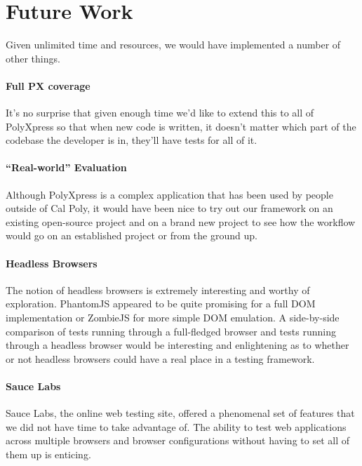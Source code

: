 \documentclass[12pt]{ucthesis}
\begin{document}
\chapter{Future Work}
Given unlimited time and resources, we would have implemented a number of other things.

\subsubsection{Full PX coverage}
It's no surprise that given enough time we'd like to extend this to all of PolyXpress so that when new code is written, it doesn't matter which part of the codebase the developer is in, they'll have tests for all of it.

\subsubsection{``Real-world'' Evaluation}
Although PolyXpress is a complex application that has been used by people outside of Cal Poly, it would have been nice to try out our framework on an existing open-source project and on a brand new project to see how the workflow would go on an established project or from the ground up.

\subsubsection{Headless Browsers}
The notion of headless browsers is extremely interesting and worthy of exploration. PhantomJS appeared to be quite promising for a full DOM implementation or ZombieJS for more simple DOM emulation. A side-by-side comparison of tests running through a full-fledged browser and tests running through a headless browser would be interesting and enlightening as to whether or not headless browsers could have a real place in a testing framework.

\subsubsection{Sauce Labs}
Sauce Labs, the online web testing site, offered a phenomenal set of features that we did not have time to take advantage of. The ability to test web applications across multiple browsers and browser configurations without having to set all of them up is enticing.

\end{document}
